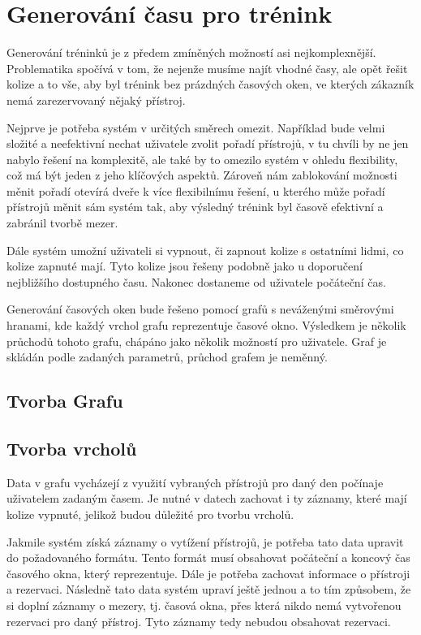 \section{Generování času pro trénink}
Generování tréninků je z předem zmíněných možností asi nejkomplexnější. Problematika spočívá v tom, že nejenže musíme najít vhodné časy, ale opět řešit kolize a to vše, aby byl trénink bez prázdných časových oken, ve kterých zákazník nemá zarezervovaný nějaký přístroj. 

Nejprve je potřeba systém v určitých směrech omezit. Například bude velmi složité a neefektivní nechat uživatele zvolit pořadí přístrojů, v tu chvíli by ne jen nabylo řešení na komplexitě, ale také by to omezilo systém v ohledu flexibility, což má být jeden z jeho klíčových aspektů. Zároveň nám zablokování možnosti měnit pořadí otevírá dveře k více flexibilnímu řešení, u kterého může pořadí přístrojů měnit sám systém tak, aby výsledný trénink byl časově efektivní a zabránil tvorbě mezer.

Dále systém umožní uživateli si vypnout, či zapnout kolize s ostatními lidmi, co kolize zapnuté mají. Tyto kolize jsou řešeny podobně jako u doporučení nejbližšího dostupného času. Nakonec dostaneme od uživatele počáteční čas. 

Generování časových oken bude řešeno pomocí grafů s neváženými směrovými hranami, kde každý vrchol grafu reprezentuje časové okno. Výsledkem je několik průchodů tohoto grafu, chápáno jako několik možností pro uživatele. Graf je skládán podle zadaných parametrů, průchod grafem je neměnný. 
\subsection{Tvorba Grafu}

\subsection{Tvorba vrcholů}
Data v grafu vycházejí z využití vybraných přístrojů pro daný den počínaje uživatelem zadaným časem. Je nutné v datech zachovat i ty záznamy, které mají kolize vypnuté, jelikož budou důležité pro tvorbu vrcholů.

Jakmile systém získá záznamy o vytížení přístrojů, je potřeba tato data upravit do požadovaného formátu. Tento formát musí obsahovat počáteční a koncový čas časového okna, který reprezentuje. Dále je potřeba  zachovat informace o přístroji a rezervaci. Následně tato data systém upraví ještě jednou a to tím způsobem, že si doplní záznamy o mezery, tj. časová okna, přes která nikdo nemá vytvořenou rezervaci pro daný přístroj. Tyto záznamy tedy nebudou obsahovat rezervaci. 

